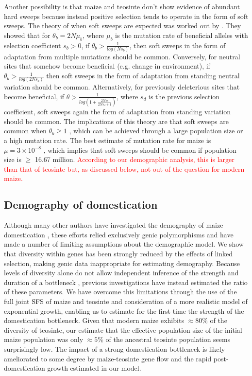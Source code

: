 \documentclass{pnastwo}
\begin{document}
\begin{article}
Another possibility is that maize and teosinte don't show evidence of abundant hard sweeps because instead positive selection tends to operate in the form of soft sweeps. The theory of when soft sweeps are expected was worked out by \cite{messer2013population}. They showed that for $\theta_b = 2N\mu_b$, where $\mu_b$ is the mutation rate of beneficial alleles with selection coefficient $s_b > 0$, if $\theta_b > \frac{1}{log({Ns_b})}$, then soft sweeps in the form of adaptation from multiple mutations should be common. Conversely, for neutral sites that somehow become beneficial (e.g. change in environment), if $\theta_b > \frac{1}{log({2Ns_b})}$ then soft sweeps in the form of adaptation from standing neutral variation should be common. Alternatively, for previously deleterious sites that become beneficial, if $\theta > \frac{1}{log \left(1+\frac{2Ns_b}{2Ns_d + 1} \right)}$, where $s_d$ is the previous selection coefficient, soft sweeps again the form of adaptation from standing variation should be common. The implications of this theory are that soft sweeps are common when $\theta_b \geq 1$ \cite{messer2013population}, which can be achieved through a large population size or a high mutation rate. The best estimate of mutation rate for maize is $\mu = 3 \times 10^{-8}$  \cite{clark2005}, which implies that soft sweeps should be common if population size is $\geq$ 16.67 million. \textcolor{red}{According to our demographic analysis, this is larger than that of teosinte but, as discussed below, not out of the question for modern maize.}
\subsection{Demography of domestication}

Although many other authors have investigated the demography of maize domestication \cite{eyre1998, tenaillon2004selection, wright2005}, these  efforts relied  exclusively genic polymorphisms and have made a number of limiting assumptions about the demographic model.  
We show that diversity within genes has been strongly reduced by the effects of linked selection, making genic data inappropriate for estimating demography.
Because levels of diversity alone do not allow independent inference of the strength and duration of a bottleneck \cite{tenaillon2004selection}, previous investigations have instead estimated the ratio of these parameters.  
We have overcome this limitations through the use of the full joint SFS of maize and teosinte and consideration of a more realistic model of exponential growth, enabling us to estimate for the first time the strength of the domestication bottleneck.  
Given that modern maize exhibits $\approx 80\%$ of the diversity of teosinte, our estimate that  the effective population size of the initial maize  population was only $\approx 5\%$ of the ancestral teosinte population seems surprisingly low.
The impact of a strong domestication bottleneck is likely ameliorated to some degree by  maize-teosinte gene flow and the rapid post-domestication growth estimated in our model.   


\end{article}
\end{document}
